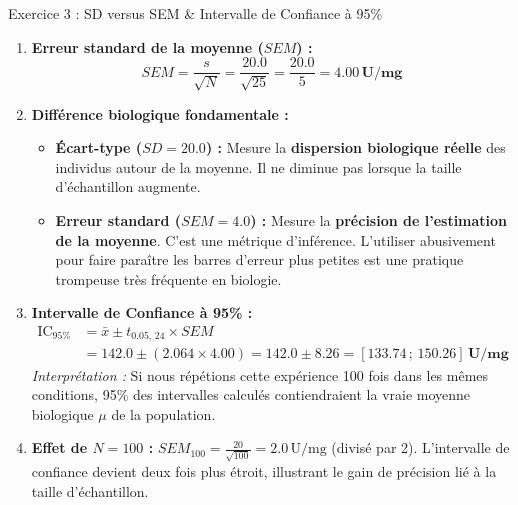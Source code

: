 \documentclass[11pt,a4paper]{article}
\begin{document}
\begin{solutionbox}{Exercice 3 : SD versus SEM \& Intervalle de Confiance à 95\%}
\begin{enumerate}[label=\textbf{\alph*.}]
  \item \textbf{Erreur standard de la moyenne ($SEM$) :}
  \begin{equation*}
    SEM = \frac{s}{\sqrt{N}} = \frac{20.0}{\sqrt{25}} = \frac{20.0}{5} = \mathbf{4.00\,\text{U/mg}}
  \end{equation*}

  \item \textbf{Différence biologique fondamentale :}
  \begin{itemize}
    \item \textbf{Écart-type ($SD = 20.0$) :} Mesure la \textbf{dispersion biologique réelle} des individus autour de la moyenne. Il ne diminue pas lorsque la taille d'échantillon augmente.
    \item \textbf{Erreur standard ($SEM = 4.0$) :} Mesure la \textbf{précision de l'estimation de la moyenne}. C'est une métrique d'inférence. L'utiliser abusivement pour faire paraître les barres d'erreur plus petites est une pratique trompeuse très fréquente en biologie.
  \end{itemize}

  \item \textbf{Intervalle de Confiance à 95\% :}
  \begin{align*}
    \text{IC}_{95\%} &= \bar{x} \pm t_{0.05, \, 24} \times SEM \\
    &= 142.0 \pm (2.064 \times 4.00) = 142.0 \pm 8.26 = \mathbf{[133.74 \,;\, 150.26]\,\text{U/mg}}
  \end{align*}
  \textit{Interprétation :} Si nous répétions cette expérience 100 fois dans les mêmes conditions, 95\% des intervalles calculés contiendraient la vraie moyenne biologique $\mu$ de la population.

  \item \textbf{Effet de $N = 100$ :}
  $SEM_{100} = \frac{20}{\sqrt{100}} = 2.0\,\text{U/mg}$ (divisé par 2). L'intervalle de confiance devient deux fois plus étroit, illustrant le gain de précision lié à la taille d'échantillon.
\end{enumerate}
\end{solutionbox}
\end{document}
